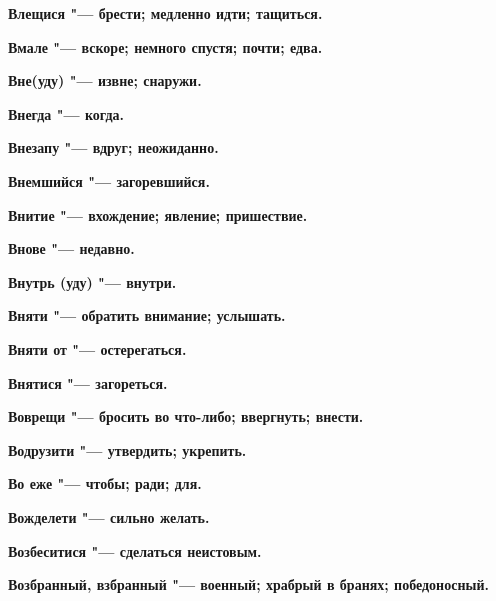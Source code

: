 \bfseries Влещися \normalfont{} "--- брести; медленно идти; тащиться. 




\bfseries Вмале \normalfont{} "--- вскоре; немного спустя; почти; едва. 




\bfseries Вне(уду) \normalfont{} "--- извне; снаружи. 




\bfseries Внегда \normalfont{} "--- когда. 




\bfseries Внезапу \normalfont{} "--- вдруг; неожиданно. 




\bfseries Внемшийся \normalfont{} "--- загоревшийся. 




\bfseries Внитие \normalfont{} "--- вхождение; явление; пришествие. 




\bfseries Внове \normalfont{} "--- недавно. 




\bfseries Внутрь (уду) \normalfont{} "--- внутри. 




\bfseries Вняти \normalfont{} "--- обратить внимание; услышать. 




\bfseries Вняти от \normalfont{} "--- остерегаться. 




\bfseries Внятися \normalfont{} "--- загореться. 




\bfseries Воврещи \normalfont{} "--- бросить во что-либо; ввергнуть; внести. 




\bfseries Водрузити \normalfont{} "--- утвердить; укрепить. 




\bfseries Во еже \normalfont{} "--- чтобы; ради; для. 




\bfseries Вожделети \normalfont{} "--- сильно желать. 




\bfseries Возбеситися \normalfont{} "--- сделаться неистовым. 




\bfseries Возбранный, взбранный \normalfont{} "--- военный; храбрый в бранях; победоносный. 




